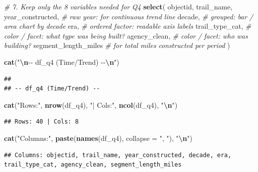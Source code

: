 \documentclass[
]{article}
\newenvironment{Shaded}{\begin{snugshade}}{\end{snugshade}}
\newcommand{\AttributeTok}[1]{\textcolor[rgb]{0.13,0.29,0.53}{#1}}
\newcommand{\CommentTok}[1]{\textcolor[rgb]{0.56,0.35,0.01}{\textit{#1}}}
\newcommand{\FunctionTok}[1]{\textcolor[rgb]{0.13,0.29,0.53}{\textbf{#1}}}
\newcommand{\NormalTok}[1]{#1}
\newcommand{\SpecialCharTok}[1]{\textcolor[rgb]{0.81,0.36,0.00}{\textbf{#1}}}
\newcommand{\StringTok}[1]{\textcolor[rgb]{0.31,0.60,0.02}{#1}}
\begin{document}
\begin{Shaded}
\begin{Highlighting}[]
  \CommentTok{\# 7. Keep only the 8 variables needed for Q4}
  \FunctionTok{select}\NormalTok{(}
\NormalTok{    objectid,}
\NormalTok{    trail\_name,}
\NormalTok{    year\_constructed,      }\CommentTok{\# raw year: for continuous trend line}
\NormalTok{    decade,                }\CommentTok{\# grouped: bar / area chart by decade}
\NormalTok{    era,                   }\CommentTok{\# ordered factor: readable axis labels}
\NormalTok{    trail\_type\_cat,        }\CommentTok{\# color / facet: what type was being built?}
\NormalTok{    agency\_clean,          }\CommentTok{\# color / facet: who was building?}
\NormalTok{    segment\_length\_miles   }\CommentTok{\# for total miles constructed per period}
\NormalTok{  )}

\FunctionTok{cat}\NormalTok{(}\StringTok{"}\SpecialCharTok{\textbackslash{}n}\StringTok{{-}{-} df\_q4 (Time/Trend) {-}{-}}\SpecialCharTok{\textbackslash{}n}\StringTok{"}\NormalTok{)}
\end{Highlighting}
\end{Shaded}

\begin{verbatim}
## 
## -- df_q4 (Time/Trend) --
\end{verbatim}

\begin{Shaded}
\begin{Highlighting}[]
\FunctionTok{cat}\NormalTok{(}\StringTok{"Rows:"}\NormalTok{, }\FunctionTok{nrow}\NormalTok{(df\_q4), }\StringTok{"| Cols:"}\NormalTok{, }\FunctionTok{ncol}\NormalTok{(df\_q4), }\StringTok{"}\SpecialCharTok{\textbackslash{}n}\StringTok{"}\NormalTok{)}
\end{Highlighting}
\end{Shaded}

\begin{verbatim}
## Rows: 40 | Cols: 8
\end{verbatim}

\begin{Shaded}
\begin{Highlighting}[]
\FunctionTok{cat}\NormalTok{(}\StringTok{"Columns:"}\NormalTok{, }\FunctionTok{paste}\NormalTok{(}\FunctionTok{names}\NormalTok{(df\_q4), }\AttributeTok{collapse =} \StringTok{", "}\NormalTok{), }\StringTok{"}\SpecialCharTok{\textbackslash{}n}\StringTok{"}\NormalTok{)}
\end{Highlighting}
\end{Shaded}

\begin{verbatim}
## Columns: objectid, trail_name, year_constructed, decade, era, trail_type_cat, agency_clean, segment_length_miles
\end{verbatim}
\end{document}
